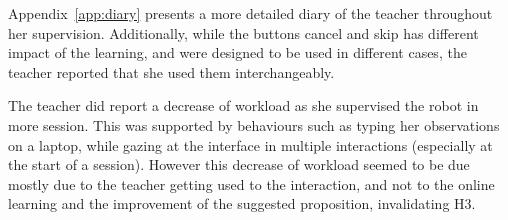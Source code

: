 Appendix~\ref{app:diary} presents a more detailed diary of the teacher throughout her supervision. Additionally, while the buttons cancel and skip has different impact of the learning, and were designed to be used in different cases, the teacher reported that she used them interchangeably.

The teacher did report a decrease of workload as she supervised the robot in more session. This was supported by behaviours such as typing her observations on a laptop, while gazing at the interface in multiple interactions (especially at the start of a session). However this decrease of workload seemed to be due mostly due to the teacher getting used to the interaction, and not to the online learning and the improvement of the suggested proposition, invalidating H3.


